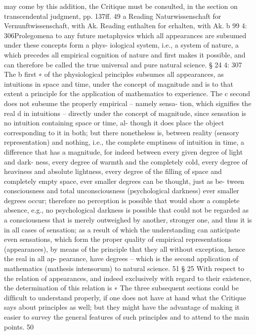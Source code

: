 may come by this addition, the Critique must be consulted, in the section on
transcendental judgment, pp. 137ff. 49
a Reading Naturwissenschaft for Vernunftwissenschaft, with Ak.
Reading enthalten for erhalten, with Ak.
b
99
4: 306Prolegomena to any future metaphysics
which all appearances are subsumed under these concepts form a phys-
iological system, i.e., a system of nature, a which precedes all empirical
cognition of nature and ﬁrst makes it possible, and can therefore be called
the true universal and pure natural science.
§ 24
4: 307
The b ﬁrst ∗ of the physiological principles subsumes all appearances, as
intuitions in space and time, under the concept of magnitude and is to
that extent a principle for the application of mathematics to experience.
The c second does not subsume the properly empirical – namely sensa-
tion, which signiﬁes the real d in intuitions – directly under the concept
of magnitude, since sensation is no intuition containing space or time, al-
though it does place the object corresponding to it in both; but there
nonetheless is, between reality (sensory representation) and nothing,
i.e., the complete emptiness of intuition in time, a difference that has
a magnitude, for indeed between every given degree of light and dark-
ness, every degree of warmth and the completely cold, every degree of
heaviness and absolute lightness, every degree of the ﬁlling of space and
completely empty space, ever smaller degrees can be thought, just as be-
tween consciousness and total unconsciousness (psychological darkness)
ever smaller degrees occur; therefore no perception is possible that would
show a complete absence, e.g., no psychological darkness is possible that
could not be regarded as a consciousness that is merely outweighed by
another, stronger one, and thus it is in all cases of sensation; as a result
of which the understanding can anticipate even sensations, which form
the proper quality of empirical representations (appearances), by means
of the principle that they all without exception, hence the real in all ap-
pearance, have degrees – which is the second application of mathematics
(mathesis intensorum) to natural science. 51
§ 25
With respect to the relation of appearances, and indeed exclusively
with regard to their existence, the determination of this relation is
∗ The three subsequent sections could be difﬁcult to understand properly, if one
does not have at hand what the Critique says about principles as well; but they
might have the advantage of making it easier to survey the general features of
such principles and to attend to the main points. 50
